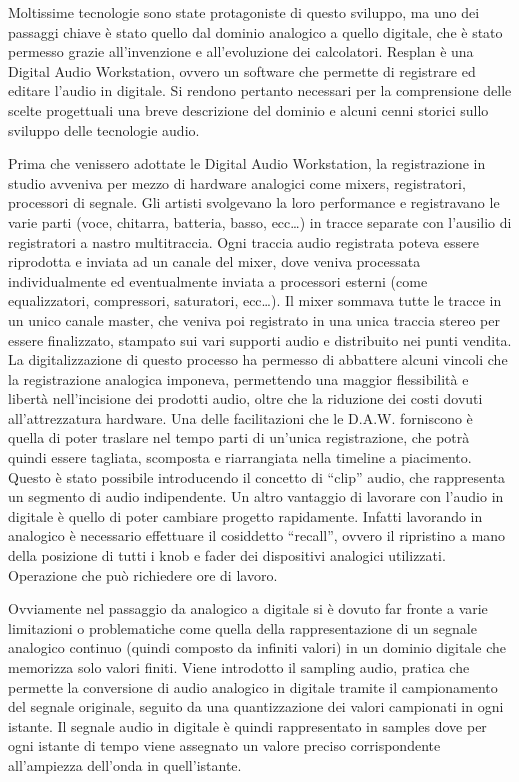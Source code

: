 \documentclass[a4paper,12pt]{report}
\begin{document}
Moltissime tecnologie sono state protagoniste di questo sviluppo, ma uno dei passaggi chiave è stato quello dal dominio analogico a quello digitale, che è stato permesso grazie all’invenzione e all’evoluzione dei calcolatori. 
Resplan è una Digital Audio Workstation, ovvero un software che permette di registrare ed editare l’audio in digitale. Si rendono pertanto necessari per la comprensione delle scelte progettuali una breve descrizione del dominio e alcuni cenni storici sullo sviluppo delle tecnologie audio.

Prima che venissero adottate le Digital Audio Workstation, la registrazione in studio avveniva per mezzo di hardware analogici come mixers, registratori, processori di segnale.
Gli artisti svolgevano la loro performance e registravano le varie parti (voce, chitarra, batteria, basso, ecc…) in tracce separate con l’ausilio di registratori a nastro multitraccia.
Ogni traccia audio registrata poteva essere riprodotta e inviata ad un canale del mixer, dove veniva processata individualmente ed eventualmente inviata a processori esterni (come equalizzatori, compressori, saturatori, ecc…).
Il mixer sommava tutte le tracce in un unico canale master, che veniva poi registrato in una unica traccia stereo per essere finalizzato, stampato sui vari supporti audio e distribuito nei punti vendita.
La digitalizzazione di questo processo ha permesso di abbattere alcuni vincoli che la registrazione analogica imponeva, permettendo una maggior flessibilità e libertà nell’incisione dei prodotti audio, oltre che la riduzione dei costi dovuti all’attrezzatura hardware.
Una delle facilitazioni che le D.A.W. forniscono è quella di poter traslare nel tempo parti di un'unica registrazione, che potrà quindi essere tagliata, scomposta e riarrangiata nella timeline a piacimento. Questo è stato possibile introducendo il concetto di “clip” audio, che rappresenta un segmento di audio indipendente. 
Un altro vantaggio di lavorare con l’audio in digitale è quello di poter cambiare progetto rapidamente. Infatti lavorando in analogico è necessario effettuare il cosiddetto “recall”, ovvero il ripristino a mano della posizione di tutti i knob e fader dei dispositivi analogici utilizzati. Operazione che può richiedere ore di lavoro.

Ovviamente nel passaggio da analogico a digitale si è dovuto far fronte a varie limitazioni o problematiche come quella della rappresentazione di un segnale analogico continuo (quindi composto da infiniti valori) in un dominio digitale che memorizza solo valori finiti. Viene introdotto il sampling audio, pratica che permette la conversione di audio analogico in digitale tramite il campionamento del segnale originale, seguito da una quantizzazione dei valori campionati in ogni istante.
Il segnale audio in digitale è quindi rappresentato in samples dove per ogni istante di tempo viene assegnato un valore preciso corrispondente all’ampiezza dell’onda in quell’istante.
\end{document}
